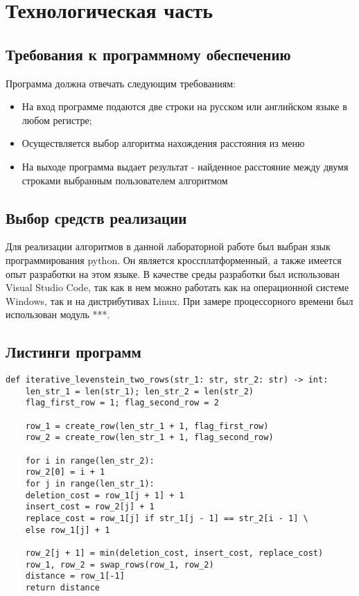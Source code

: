 \documentclass[12pt, a4paper]{article}
\begin{document}
\newpage
\section{Технологическая часть}
\subsection{Требования к программному обеспечению}
Программа должна отвечать следующим требованиям:
\begin{itemize}
	\item На вход программе подаются две строки на русском или английском языке в любом регистре;
	\item Осуществляется выбор алгоритма нахождения расстояния из меню
	\item На выходе программа выдает результат - найденное расстояние между двумя строками выбранным пользователем алгоритмом
\end{itemize}
\subsection{Выбор средств реализации}
Для реализации алгоритмов в данной лабораторной работе был выбран язык программирования python. Он является кроссплатформенный, а также имеется опыт разработки на этом языке. В качестве среды разработки был использован Visual Studio Code, так как в нем можно работать как на операционной системе Windows, так и на дистрибутивах Linux. При замере процессорного времени был использован модуль ***.
\subsection{Листинги программ}
\begin{lstlisting}[label=some-code,caption=Программный код нахождения расстояния Левенштейна итеративно с использованием двух строк]
	def iterative_levenstein_two_rows(str_1: str, str_2: str) -> int:
	len_str_1 = len(str_1); len_str_2 = len(str_2)
	flag_first_row = 1; flag_second_row = 2
	
	row_1 = create_row(len_str_1 + 1, flag_first_row)
	row_2 = create_row(len_str_1 + 1, flag_second_row)
	
	for i in range(len_str_2):
	row_2[0] = i + 1
	for j in range(len_str_1):
	deletion_cost = row_1[j + 1] + 1
	insert_cost = row_2[j] + 1
	replace_cost = row_1[j] if str_1[j - 1] == str_2[i - 1] \
	else row_1[j] + 1
	
	row_2[j + 1] = min(deletion_cost, insert_cost, replace_cost)
	row_1, row_2 = swap_rows(row_1, row_2)
	distance = row_1[-1]
	return distance
\end{lstlisting}
\end{document}
